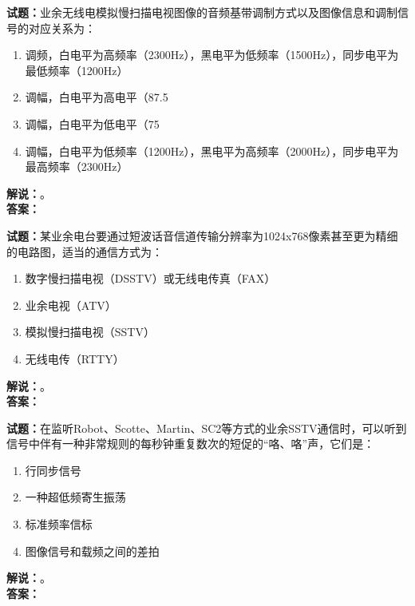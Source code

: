 \documentclass{ctexbook}
\begin{document}
\bigskip




\noindent\textbf{试题：}业余无线电模拟慢扫描电视图像的音频基带调制方式以及图像信息和调制信号的对应关系为：
\begin{enumerate}[leftmargin=3em]
\item 调频，白电平为高频率（2300Hz），黑电平为低频率（1500Hz），同步电平为最低频率（1200Hz）
\item 调幅，白电平为高电平（87.5%
\item 调幅，白电平为低电平（75%
\item 调幅，白电平为低频率（1200Hz），黑电平为高频率（2000Hz），同步电平为最高频率（2300Hz）
\end{enumerate}
\noindent\textbf{解说：}\textbf{}。\\\noindent\textbf{答案：}

\bigskip




\noindent\textbf{试题：}某业余电台要通过短波话音信道传输分辨率为1024x768像素甚至更为精细的电路图，适当的通信方式为： 
\begin{enumerate}[leftmargin=3em]
\item 数字慢扫描电视（DSSTV）或无线电传真（FAX）
\item 业余电视（ATV）
\item 模拟慢扫描电视（SSTV）
\item 无线电传（RTTY）
\end{enumerate}
\noindent\textbf{解说：}\textbf{}。\\\noindent\textbf{答案：}

\bigskip




\noindent\textbf{试题：}在监听Robot、Scotte、Martin、SC2等方式的业余SSTV通信时，可以听到信号中伴有一种非常规则的每秒钟重复数次的短促的“咯、咯”声，它们是：
\begin{enumerate}[leftmargin=3em]
\item 行同步信号
\item 一种超低频寄生振荡
\item 标准频率信标
\item 图像信号和载频之间的差拍
\end{enumerate}
\noindent\textbf{解说：}\textbf{}。\\\noindent\textbf{答案：}

\bigskip
\end{document}
